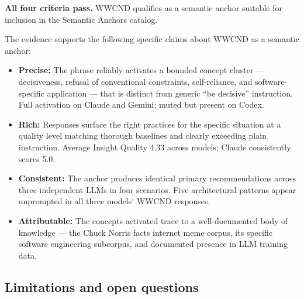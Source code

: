 \documentclass[10.5pt,a4paper]{article}
\begin{document}
\begin{tcolorbox}[passbox, title={Overall Result: POSITIVE — Recommended for catalog inclusion}]
\textbf{All four criteria pass.} WWCND qualifies as a semantic anchor suitable for
inclusion in the Semantic Anchors catalog.

\medskip
The evidence supports the following specific claims about WWCND as a semantic anchor:

\begin{itemize}[leftmargin=1.2em, itemsep=3pt]
  \item \textbf{Precise:} The phrase reliably activates a bounded concept cluster —
    decisiveness, refusal of conventional constraints, self-reliance, and
    software-specific application — that is distinct from generic ``be decisive''
    instruction. Full activation on Claude and Gemini; muted but present on Codex.

  \item \textbf{Rich:} Responses surface the right practices for the specific situation
    at a quality level matching thorough baselines and clearly exceeding plain instruction.
    Average Insight Quality 4.33 across models; Claude consistently scores 5.0.

  \item \textbf{Consistent:} The anchor produces identical primary recommendations across
    three independent LLMs in four scenarios. Five architectural patterns appear
    unprompted in all three models' WWCND responses.

  \item \textbf{Attributable:} The concepts activated trace to a well-documented body
    of knowledge — the Chuck Norris facts internet meme corpus, its specific software
    engineering subcorpus, and documented presence in LLM training data.
\end{itemize}
\end{tcolorbox}

\subsection{Limitations and open questions}
\end{document}
